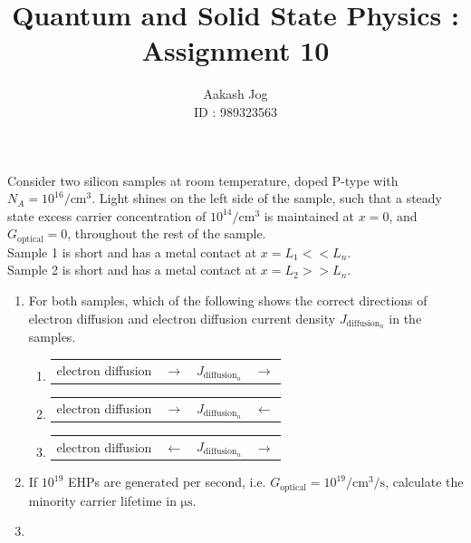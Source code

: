 \documentclass[fleqn, a4paper, 11pt, oneside]{amsart}
\title{Quantum and Solid State Physics : Assignment 10}
\author
{
	Aakash Jog\\
	ID : 989323563
}
\date{\formatdate{31}{12}{2015}}
\theoremstyle{definition}
\theoremstyle{theorem}
\begin{document}

\maketitle

\begin{question}
	Consider two silicon samples at room temperature, doped P-type with $N_A = 10^{16} \si{\per\centi\metre\cubed}$.
	Light shines on the left side of the sample, such that a steady state excess carrier concentration of $10^{14} \si{\per\centi\metre\cubed}$ is maintained at $x = 0$, and $G_{\text{optical}} = 0$, throughout the rest of the sample.\\
	Sample 1 is short and has a metal contact at $x = L_1 << L_n$.\\
	Sample 2 is short and has a metal contact at $x = L_2 >> L_n$.
	\begin{enumerate}
		\item
			For both samples, which of the following shows the correct directions of electron diffusion and electron diffusion current density $J_{\text{diffusion}_n}$ in the samples.
			\begin{enumerate}
				\item
					\begin{tabular}{l l l l}
						electron diffusion & $\rightarrow$ & $J_{\text{diffusion}_n}$ & $\rightarrow$\\
					\end{tabular}
				\item
					\begin{tabular}{l l l l}
						electron diffusion & $\rightarrow$ & $J_{\text{diffusion}_n}$ & $\leftarrow$\\
					\end{tabular}
				\item
					\begin{tabular}{l l l l}
						electron diffusion & $\leftarrow$ & $J_{\text{diffusion}_n}$ & $\rightarrow$\\
					\end{tabular}
			\end{enumerate}
		\item
			If $10^{19}$ EHPs are generated per second, i.e. $G_{\text{optical}} = 10^{19} \si{\per\centi\metre\cubed\per\second}$, calculate the minority carrier lifetime in $\si{\micro\second}$.
		\item

\end{enumerate}
\end{question}
\end{document}
